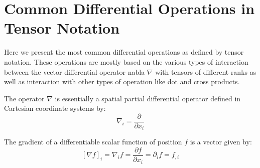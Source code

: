 % 
% 
% 


\section{Common Differential Operations in Tensor Notation}

 Here we present the most common differential operations
as defined by tensor notation. These operations are mostly based on
the various types of interaction between the vector differential operator
nabla $\nabla$ with tensors of different ranks as well as interaction
with other types of operation like dot and cross products.

The operator $\nabla$ is essentially a spatial partial differential
operator defined in Cartesian coordinate systems by:
\begin{equation}
\nabla_{i}=\dfrac{\partial}{\partial x_{i}}
\end{equation}


 The gradient of a differentiable scalar function of position
$f$ is a vector given by:
\begin{equation}
\left[\nabla f\right]_{i}=\nabla_{i}f=\dfrac{\partial f}{\partial 
x_{i}}=\partial_{i}f=f_{,i}\label{eqGrad}
\end{equation}


